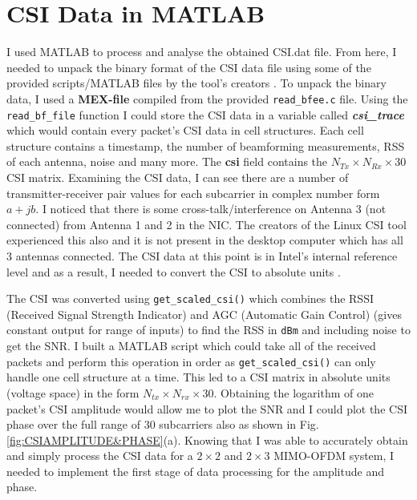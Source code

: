 \section{CSI Data in MATLAB}
I used MATLAB to process and analyse the obtained CSI.dat file. From here, I needed to unpack the binary format of the CSI data file using some of the provided scripts/MATLAB files by the tool's creators \citep{Halperin_csitool}. To unpack the binary data, I used a \textbf{MEX-file} compiled from the provided \lstinline{read_bfee.c} file. Using the \lstinline{read_bf_file} function I could store the CSI data in a variable called \textbf{\textit{csi\_trace}} which would contain every packet's CSI data in cell structures. Each cell structure contains a timestamp, the number of beamforming measurements, RSS of each antenna, noise and many more. The \textbf{csi} field contains the $N_{Tx}\times N_{Rx}\times 30$ CSI matrix. Examining the CSI data, I can see there are a number of transmitter-receiver pair values for each subcarrier in complex number form $a + jb$. I noticed that there is some cross-talk/interference on Antenna 3 (not connected) from Antenna 1 and 2 in the NIC. The creators of the Linux CSI tool experienced this also and it is not present in the desktop computer which has all 3 antennas connected. The CSI data at this point is in Intel's internal reference level and as a result, I needed to convert the CSI to absolute units \citep{Halperin_csitool}. \par
The CSI was converted using \lstinline{get_scaled_csi()} which combines the RSSI (Received Signal Strength Indicator) and AGC (Automatic Gain Control) (gives constant output for range of inputs) to find the RSS in \lstinline{dBm} and including noise to get the SNR. I built a MATLAB script which could take all of the received packets and perform this operation in order as \lstinline{get_scaled_csi()} can only handle one cell structure at a time. This led to a CSI matrix in absolute units (voltage space) in the form $N_{tx}\times N_{rx}\times30$. Obtaining the logarithm of one packet's CSI amplitude would allow me to plot the SNR and I could plot the CSI phase over the full range of 30 subcarriers also as shown in Fig. \ref{fig:CSIAMPLITUDE&PHASE}(a).
Knowing that I was able to accurately obtain and simply process the CSI data for a $2\times 2$ and $2\times 3$ MIMO-OFDM system, I needed to implement the first stage of data processing for the amplitude and phase. 
